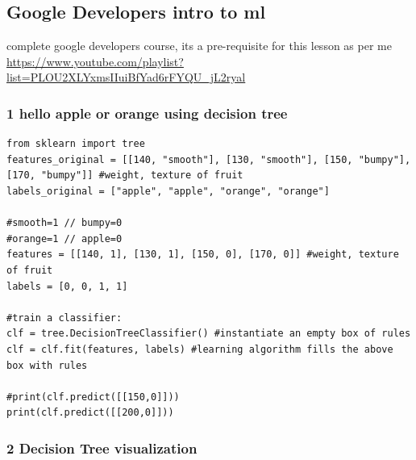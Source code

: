 \documentclass[11pt]{article}
\begin{document}
\subsection{Google Developers intro to ml}
\label{sec:org6617687}
complete google developers course, its a pre-requisite for this lesson as per me
\url{https://www.youtube.com/playlist?list=PLOU2XLYxmsIIuiBfYad6rFYQU\_jL2ryal}

\subsubsection{1 hello apple or orange using decision tree}
\label{sec:orga541a96}
\begin{verbatim}
from sklearn import tree
features_original = [[140, "smooth"], [130, "smooth"], [150, "bumpy"], [170, "bumpy"]] #weight, texture of fruit
labels_original = ["apple", "apple", "orange", "orange"]

#smooth=1 // bumpy=0
#orange=1 // apple=0
features = [[140, 1], [130, 1], [150, 0], [170, 0]] #weight, texture of fruit
labels = [0, 0, 1, 1]

#train a classifier: 
clf = tree.DecisionTreeClassifier() #instantiate an empty box of rules
clf = clf.fit(features, labels) #learning algorithm fills the above box with rules

#print(clf.predict([[150,0]]))
print(clf.predict([[200,0]]))
\end{verbatim}


\subsubsection{2 Decision Tree visualization}
\label{sec:orga0543d8}
\end{document}
